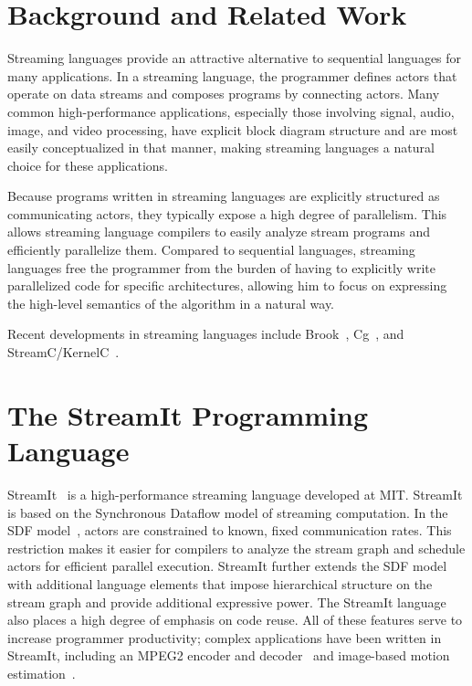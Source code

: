 \section{Background and Related Work}\label{ch:bg}

Streaming languages provide an attractive alternative to sequential languages for many applications. In a streaming language, the programmer defines actors that operate on data streams and composes programs by connecting actors. Many common high-performance applications, especially those involving signal, audio, image, and video processing, have explicit block diagram structure and are most easily conceptualized in that manner, making streaming languages a natural choice for these applications.

Because programs written in streaming languages are explicitly structured as communicating actors, they typically expose a high degree of parallelism. This allows streaming language compilers to easily analyze stream programs and efficiently parallelize them. Compared to sequential languages, streaming languages free the programmer from the burden of having to explicitly write parallelized code for specific architectures, allowing him to focus on expressing the high-level semantics of the algorithm in a natural way.

Recent developments in streaming languages include Brook~\cite{brook}, Cg~\cite{cg}, and StreamC/KernelC~\cite{streamc}.

\section{The StreamIt Programming Language}\label{ch:bg:str}

StreamIt~\cite{asplos02} is a high-performance streaming language developed at MIT. StreamIt is based on the Synchronous Dataflow model of streaming computation. In the SDF model~\cite{sdf}, actors are constrained to known, fixed communication rates. This restriction makes it easier for compilers to analyze the stream graph and schedule actors for efficient parallel execution. StreamIt further extends the SDF model with additional language elements that impose hierarchical structure on the stream graph and provide additional expressive power. The StreamIt language also places a high degree of emphasis on code reuse. All of these features serve to increase programmer productivity; complex applications have been written in StreamIt, including an MPEG2 encoder and decoder~\cite{mpeg} and image-based motion estimation~\cite{basier}.

